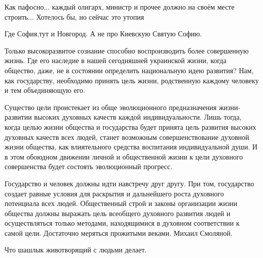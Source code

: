 \begin{itemize}
Как пафосно... каждый олигарх, министр и прочее должно на своём месте строить... Хотелось бы, но сейчас это утопия

 
Где София,тут и Новгород. А не про Киевскую Святую Софию.

 

Только высокоразвитое сознание способно воспроизводить более совершенную жизнь.
Где его наследие в нашей сегодняшней украинской жизни, когда общество, даже, не
в состоянии определить национальную идею развития? Нам, как государству,
необходимо принять цель жизни, родственную каждому человеку и тем объединяющую
его. 

Существо цели проистекает из обще эволюционного предназначения жизни-развитии
высоких духовных качеств каждой индивидуальности. Лишь тогда, когда целью жизни
общества и государства будет принята цель развития высоких духовных качеств
всех людей, станет возможным совершенствование духовной жизни общества, как
влиятельного средства воспитания индивидуальной души. И в этом обоюдном
движении личной и общественной жизни к цели духовного совершенства будет
состоять эволюционный прогресс. 

Государство и человек должны идти навстречу друг другу. При том, государство
создает равные условия для раскрытия и дальнейшего роста духовного потенциала
всех людей. Общественный строй и законы организации жизни общества должны
выражать цель всеобщего духовного развития людей и осуществляться только
методами, находящимися в духовном соответствии к самой цели. Достаточно
меряться прожитыми веками. Михаил Смоляной.


 
Что шашлык животворящий с людьми делает.

 

\end{itemize}
